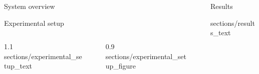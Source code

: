 \documentclass[final]{beamer}
\newlength{\sepwid}
\newlength{\onecolwid}
\newlength{\twocolwid}
\begin{document}
\begin{frame}[t]
\begin{columns}[t]
\begin{column}{\twocolwid}
\begin{block}{System overview}
	\end{block}


	\begin{block}{Experimental setup}

	\begin{columns}[c,totalwidth=\twocolwid]

		\begin{column}{1.1\onecolwid}
			{sections/experimental_setup_text}
		\end{column}

		\begin{column}{\sepwid}
		\end{column} %

		\begin{column}{0.9\onecolwid}
			{sections/experimental_setup_figure}
		\end{column}

	\end{columns}

	\end{block}


\end{column}

\begin{column}{\sepwid}\end{column} %

\begin{column}{\twocolwid}



\begin{block}{Results}

{sections/results_text}


\end{block}
\end{column}
\end{columns}
\end{frame}
\end{document}
